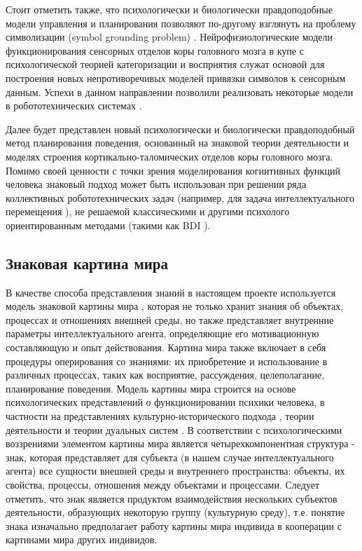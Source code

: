 \documentclass[12pt]{report}
\begin{document}
	Стоит отметить также, что психологически и биологически правдоподобные модели управления и планирования позволяют по-другому взглянуть на проблему символизации (symbol grounding problem) \cite{Harnad1990,Barsalou1999,Chella2003,Besold2015}. Нейрофизиологические модели функционирования сенсорных отделов коры головного мозга в купе с психологической теорией категоризации и восприятия служат основой для построения новых непротиворечивых моделей привязки символов к сенсорным данным. Успехи в данном направлении позволили реализовать некоторые модели в робототехнических системах \cite{Heintz2010}. 
	
	Далее будет представлен новый психологически и биологически правдоподобный метод планирования поведения, основанный на знаковой теории деятельности и моделях строения кортикально-таломических отделов коры головного мозга. Помимо своей ценности с точки зрения моделирования когнитивных функций человека знаковый подход может быть использован при решении ряда коллективных робототехнических задач (например, для задача интеллектуального перемещения \cite{Panov2015g,Panov2016d}), не решаемой классическими и другими психолого ориентированным методами (такими как BDI \cite{Sardina2006}).
		
	\subsection{Знаковая картина мира}\label{sec:swm}
	
	В качестве способа представления знаний в настоящем проекте используется модель знаковой картины мира \cite{Osipov2014c,Osipov2015b, Osipov2016}, которая не только хранит знания об объектах, процессах и отношениях внешней среды, но также представляет внутренние параметры интеллектуального агента, определяющие его мотивационную составляющую и опыт действования. Картина мира также включает в себя процедуры оперирования со знаниями: их приобретение и использование в различных процессах, таких как восприятие, рассуждения, целеполагание, планирование поведения\cite{Osipov2015d}. Модель картины мира строится на основе психологических представлений о функционировании психики человека, в частности на представлениях культурно-исторического подхода \cite{Vygotsky1999}, теории деятельности \cite{Leontiev1977,Chudova2012b} и теории дуальных систем \cite{Evans2013,Stanovich2009}. В соответствии с психологическими воззрениями элементом картины мира является четырехкомпонентная структура - знак, которая представляет для субъекта (в нашем случае интеллектуального агента) все сущности внешней среды и внутреннего пространства: объекты, их свойства, процессы, отношения между объектами и процессами. Следует отметить, что знак является продуктом взаимодействия нескольких субъектов деятельности, образующих некоторую группу (культурную среду), т.е. понятие знака изначально предполагает работу картины мира индивида в кооперации с картинами мира других индивидов.
	
\end{document}
